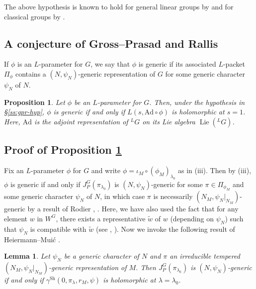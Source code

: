 \documentclass[11pt]{amsart}
\numberwithin{equation}{section}
\theoremstyle{plain}
\newtheorem{lem}[thm]{Lemma}
\newtheorem{prop}[thm]{Proposition}
\theoremstyle{definition}
\theoremstyle{remark}
\def\Lie{\operatorname{Lie}}
\def\Ad{\mathrm{Ad}}
\def\Sh{\mathrm{Sh}}
\begin{document}
The above hypothesis is known to hold for general linear groups by \cite{ht, he, scholze} and for classical groups by \cite{a, mok}.

\subsection{A conjecture of Gross--Prasad and Rallis}

If $\phi$ is an $L$-parameter for $G$, we say that $\phi$ is generic if its associated $L$-packet $\Pi_\phi$ contains a $(N, \psi_N)$-generic representation of $G$ for some generic character $\psi_N$ of $N$.

\begin{prop}
\label{p:gp-rallis}
Let $\phi$ be an $L$-parameter for $G$.
Then, under the hypothesis in \S \ref{ss:gpr-hyp}, $\phi$ is generic if and only if $L(s, \Ad \circ \phi)$ is holomorphic at $s=1$.
Here, $\Ad$ is the adjoint representation of ${}^L G$ on its Lie algebra $\Lie({}^L G)$.
\end{prop}

\subsection{Proof of Proposition \ref{p:gp-rallis}}

Fix an $L$-parameter $\phi$ for $G$ and write $\phi = \iota_M \circ (\phi_M)_{\lambda_0}$ as in (iii).
Then by (iii), $\phi$ is generic if and only if $J^G_P(\pi_{\lambda_0})$ is $(N, \psi_N)$-generic for some $\pi \in \Pi_{\phi_M}$ and some generic character $\psi_N$ of $N$, in which case $\pi$ is necessarily $(N_M, \psi_N|_{N_M})$-generic by a result of Rodier \cite{rodier}, \cite[Corollary 1.7]{cs}.
Here, we have also used the fact that for any element $w$ in $W^G$, there exists a representative $\tilde{w}$ of $w$ (depending on $\psi_N$) such that $\psi_N$ is compatible with $\tilde{w}$ (see \cite[\S 2]{shahidi2}, \cite[\S 1.2]{cpss}).
Now we invoke the following result of Heiermann--Mui\'c \cite[Proposition 1.3]{hm}.

\begin{lem}
\label{l:gen-key}
Let $\psi_N$ be a generic character of $N$ and $\pi$ an irreducible tempered $(N_M, \psi_N|_{N_M})$-generic representation of $M$.
Then $J^G_P(\pi_{\lambda_0})$ is $(N, \psi_N)$-generic if and only if $\gamma^{\Sh}(0, \pi_\lambda, r_M, \psi)$ is holomorphic at $\lambda=\lambda_0$.
\end{lem}
\end{document}
